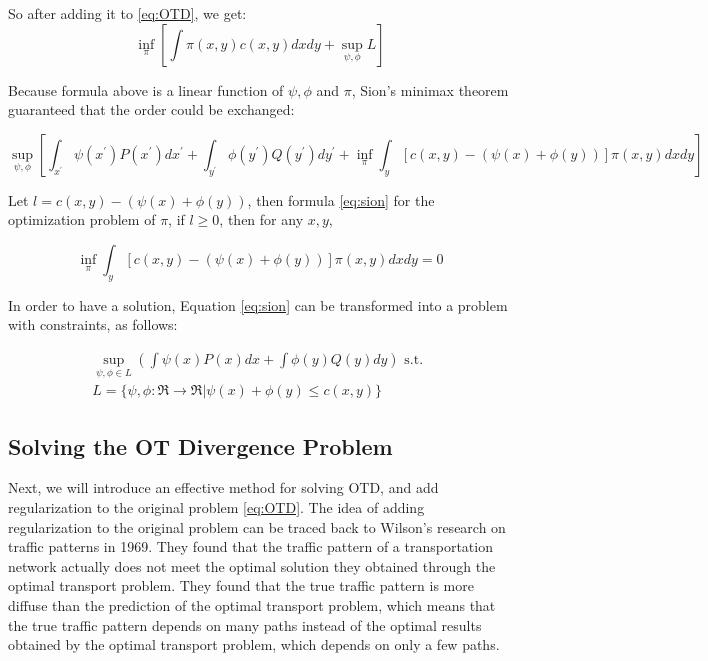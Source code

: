So after adding it to \ref{eq:OTD}, we get:
\begin{equation}
  \inf _{\pi}\left[\int \pi(x, y) c(x, y) d x d y+\sup _{\psi, \phi} L\right]
\end{equation}

Because formula above is a linear function of $\psi, \phi$ and $\pi$, Sion's minimax theorem guaranteed that the order could be exchanged:

\begin{equation}
    \label{eq:sion}
  \sup _{\psi, \phi}\left[\int_{x^{\prime}} \psi\left(x^{\prime}\right) P\left(x^{\prime}\right) d x^{\prime}+\int_{y^{\prime}} \phi\left(y^{\prime}\right) Q\left(y^{\prime}\right) d y^{\prime}+\inf _{\pi} \int_{y}[c(x, y)-(\psi(x)+\phi(y))] \pi(x, y) d x d y\right]
\end{equation}

Let $l=c(x, y)-(\psi(x)+\phi(y))$, then formula \ref{eq:sion} for the optimization problem of $\pi$, if $l \geq 0$, then for any $x, y$, 

\begin{equation}
  \inf _{\pi} \int_{y}[c(x, y)-(\psi(x)+\phi(y))] \pi(x, y) d x d y=0
\end{equation}

In order to have a solution, Equation \ref{eq:sion} can be transformed into a problem with constraints, as follows:

\begin{equation}
\begin{array}{l}{\sup _{\psi, \phi \in L}\left(\int \psi(x) P(x) d x+\int \phi(y) Q(y) d y\right) \text { s.t. }} \\ {L=\{\psi, \phi: \mathfrak{R} \rightarrow \mathfrak{R} | \psi(x)+\phi(y) \leq c(x, y)\}}\end{array}
\end{equation}

\subsection{Solving the OT Divergence Problem}
Next, we will introduce an effective method for solving OTD, and add regularization to the original problem \ref{eq:OTD}. The idea of adding regularization to the original problem can be traced back to Wilson's research on traffic patterns in 1969. They found that the traffic pattern of a transportation network actually does not meet the optimal solution they obtained through the optimal transport problem. They found that the true traffic pattern is more diffuse than the prediction of the optimal transport problem, which means that the true traffic pattern depends on many paths instead of the optimal results obtained by the optimal transport problem, which depends on only a few paths.

